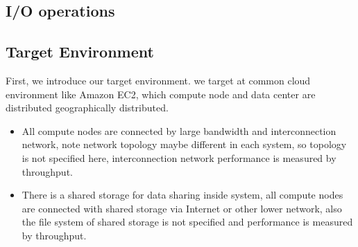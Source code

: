 \subsection{I/O operations}



\subsection{Target Environment}
First, we introduce our target environment.
we target at common cloud environment like Amazon EC2, which compute node and data center are distributed geographically distributed.

\begin{itemize}
	\item All compute nodes are connected by large bandwidth and interconnection network, note network topology maybe different in each system, so topology is not specified here, interconnection network performance is measured by throughput.
	\item There is a shared storage for data sharing inside system, all compute nodes are connected
	with shared storage via Internet or other lower network, also the file system of shared storage is not specified and performance is measured by throughput.
\end{itemize}


